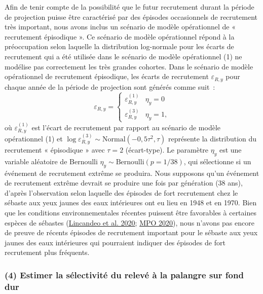 \documentclass[french,11pt]{book}
\begin{document}
Afin de tenir compte de la possibilité que le futur recrutement durant la période de projection puisse être caractérisé par des épisodes occasionnels de recrutement très important, nous avons inclus un scénario de modèle opérationnel de « recrutement épisodique ». Ce scénario de modèle opérationnel répond à la préoccupation selon laquelle la distribution log-normale pour les écarts de recrutement qui a été utilisée dans le scénario de modèle opérationnel (1) ne modélise pas correctement les très grandes cohortes. Dans le scénario de modèle opérationnel de recrutement épisodique, les écarts de recrutement \(\varepsilon_{R,y}\) pour chaque année de la période de projection sont générés comme suit~:
\begin{equation}
\varepsilon_{R,y} = 
\left\{
\begin{array}{ll}
\varepsilon^{(1)}_{R,y} & \eta_y = 0\\
\varepsilon^{(3)}_{R,y} & \eta_y = 1,
\end{array}
\right.
\end{equation}
où \(\varepsilon^{(1)}_{R,y}\) est l'écart de recrutement par rapport au scénario de modèle opérationnel (1) et \(\log\varepsilon^{(3)}_{R,y} \sim \textrm{Normal}(-0,5\tau^2, \tau)\) représente la distribution du recrutement « épisodique » avec \(\tau = 2\) (écart-type). Le paramètre \(\eta_y\) est une variable aléatoire de Bernoulli \(\eta_y \sim \textrm{Bernoulli}(p = 1/38)\), qui sélectionne si un événement de recrutement extrême se produira. Nous supposons qu'un événement de recrutement extrême devrait se produire une fois par génération (38 ans), d'après l'observation selon laquelle des épisodes de fort recrutement chez le sébaste aux yeux jaunes des eaux intérieures ont eu lieu en 1948 et en 1970. Bien que les conditions environnementales récentes puissent être favorables à certaines espèces de sébastes (\protect\hyperlink{ref-lincandeo2020}{Lincandeo et al. 2020}; \protect\hyperlink{ref-haigh2020}{MPO 2020}), nous n'avons pas encore de preuve de récents épisodes de recrutement important pour le sébaste aux yeux jaunes des eaux intérieures qui pourraient indiquer des épisodes de fort recrutement plus fréquents.

\hypertarget{sec:approach3-reference4}{%
\subsubsection{(4) Estimer la sélectivité du relevé à la palangre sur fond dur}\label{sec:approach3-reference4}}
\end{document}
